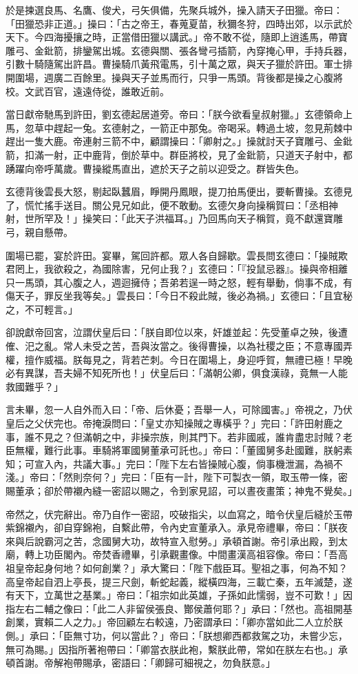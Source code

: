 於是揀選良馬、名鷹、俊犬，弓矢俱備，先聚兵城外，操入請天子田獵。帝曰：「田獵恐非正道。」操曰：「古之帝王，春蒐夏苗，秋獮冬狩，四時出郊，以示武於天下。今四海擾攘之時，正當借田獵以講武。」帝不敢不從，隨即上逍遙馬，帶寶雕弓、金鈚箭，排鑾駕出城。玄德與關、張各彎弓插箭，內穿掩心甲，手持兵器，引數十騎隨駕出許昌。曹操騎爪黃飛電馬，引十萬之眾，與天子獵於許田。軍士排開圍場，週廣二百餘里。操與天子並馬而行，只爭一馬頭。背後都是操之心腹將校。文武百官，遠遠侍從，誰敢近前。

當日獻帝馳馬到許田，劉玄德起居道旁。帝曰：「朕今欲看皇叔射獵。」玄德領命上馬，忽草中趕起一兔。玄德射之，一箭正中那兔。帝喝采。轉過土坡，忽見荊棘中趕出一隻大鹿。帝連射三箭不中，顧謂操曰：「卿射之。」操就討天子寶雕弓、金鈚箭，扣滿一射，正中鹿背，倒於草中。群臣將校，見了金鈚箭，只道天子射中，都踴躍向帝呼萬歲。曹操縱馬直出，遮於天子之前以迎受之。群皆失色。

玄德背後雲長大怒，剔起臥蠶眉，睜開丹鳳眼，提刀拍馬便出，要斬曹操。玄德見了，慌忙搖手送目。關公見兄如此，便不敢動。玄德欠身向操稱賀曰：「丞相神射，世所罕及！」操笑曰：「此天子洪福耳。」乃回馬向天子稱賀，竟不獻還寶雕弓，親自懸帶。

圍場已罷，宴於許田。宴畢，駕回許都。眾人各自歸歇。雲長問玄德曰：「操賊欺君罔上，我欲殺之，為國除害，兄何止我？」玄德曰：「『投鼠忌器』。操與帝相離只一馬頭，其心腹之人，週迴擁侍；吾弟若逞一時之怒，輕有舉動，倘事不成，有傷天子，罪反坐我等矣。」雲長曰：「今日不殺此賊，後必為禍。」玄德曰：「且宜秘之，不可輕言。」

卻說獻帝回宮，泣謂伏皇后曰：「朕自即位以來，奸雄並起：先受董卓之殃，後遭傕、汜之亂。常人未受之苦，吾與汝當之。後得曹操，以為社稷之臣；不意專國弄權，擅作威福。朕每見之，背若芒刺。今日在圍場上，身迎呼賀，無禮已極！早晚必有異謀，吾夫婦不知死所也！」伏皇后曰：「滿朝公卿，俱食漢祿，竟無一人能救國難乎？」

言未畢，忽一人自外而入曰：「帝、后休憂；吾舉一人，可除國害。」帝視之，乃伏皇后之父伏完也。帝掩淚問曰：「皇丈亦知操賊之專橫乎？」完曰：「許田射鹿之事，誰不見之？但滿朝之中，非操宗族，則其門下。若非國戚，誰肯盡忠討賊？老臣無權，難行此事。車騎將軍國舅董承可託也。」帝曰：「董國舅多赴國難，朕躬素知；可宣入內，共議大事。」完曰：「陛下左右皆操賊心腹，倘事機泄漏，為禍不淺。」帝曰：「然則奈何？」完曰：「臣有一計，陛下可製衣一領，取玉帶一條，密賜董承；卻於帶襯內縫一密詔以賜之，令到家見詔，可以晝夜畫策；神鬼不覺矣。」

帝然之，伏完辭出。帝乃自作一密詔，咬破指尖，以血寫之，暗令伏皇后縫於玉帶紫錦襯內，卻自穿錦袍，自繫此帶，令內史宣董承入。承見帝禮畢，帝曰：「朕夜來與后說霸河之苦，念國舅大功，故特宣入慰勞。」承頓首謝。帝引承出殿，到太廟，轉上功臣閣內。帝焚香禮畢，引承觀畫像。中間畫漢高祖容像。帝曰：「吾高祖皇帝起身何地？如何創業？」承大驚曰：「陛下戲臣耳。聖祖之事，何為不知？高皇帝起自泗上亭長，提三尺劍，斬蛇起義，縱橫四海，三載亡秦，五年滅楚，遂有天下，立萬世之基業。」帝曰：「祖宗如此英雄，子孫如此懦弱，豈不可歎！」因指左右二輔之像曰：「此二人非留侯張良、酇侯蕭何耶？」承曰：「然也。高祖開基創業，實賴二人之力。」帝回顧左右較遠，乃密謂承曰：「卿亦當如此二人立於朕側。」承曰：「臣無寸功，何以當此？」帝曰：「朕想卿西都救駕之功，未嘗少忘，無可為賜。」因指所著袍帶曰：「卿當衣朕此袍，繫朕此帶，常如在朕左右也。」承頓首謝。帝解袍帶賜承，密語曰：「卿歸可細視之，勿負朕意。」

